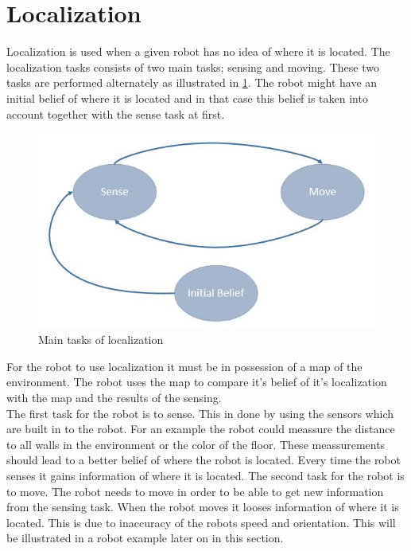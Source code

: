 
\section{Localization}

Localization is used when a given robot has no idea of where it is located. The localization tasks consists of two main tasks; sensing and moving. These two tasks are performed alternately as illustrated in \ref{fig:main tasks}. The robot might have an initial belief of where it is located and in that case this belief is taken into account together with the sense task at first.

\begin{figure}[h]
\centering
\includegraphics[scale=0.45]{images/SenseMoveInitialBelief}
\caption{Main tasks of localization}
\label{fig:main tasks}
\end{figure}

For the robot to use localization it must be in possession of a map of the environment. The robot uses the map to compare it's belief of it's localization with the map and the results of the sensing.\\

The first task for the robot is to sense. This in done by using the sensors which are built in to the robot. For an example the robot could meassure the distance to all walls in the environment or the color of the floor. These meassurements should lead to a better belief of where the robot is located. Every time the robot senses it gains information of where it is located. The second task for the robot is to move. The robot needs to move in order to be able to get new information from the sensing task. When the robot moves it looses information of where it is located. This is due to inaccuracy of the robots speed and orientation. This will be illustrated in a robot example later on in this section.\\

